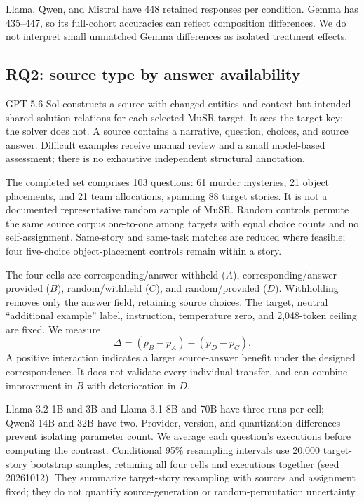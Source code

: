 Llama, Qwen, and Mistral have 448 retained responses per condition. Gemma has 435--447, so its full-cohort accuracies can reflect composition differences. We do not interpret small unmatched Gemma differences as isolated treatment effects.

\subsection{RQ2: source type by answer availability}
GPT-5.6-Sol constructs a source with changed entities and context but intended shared solution relations for each selected MuSR target. It sees the target key; the solver does not. A source contains a narrative, question, choices, and source answer. Difficult examples receive manual review and a small model-based assessment; there is no exhaustive independent structural annotation.

The completed set comprises 103 questions: 61 murder mysteries, 21 object placements, and 21 team allocations, spanning 88 target stories. It is not a documented representative random sample of MuSR. Random controls permute the same source corpus one-to-one among targets with equal choice counts and no self-assignment. Same-story and same-task matches are reduced where feasible; four five-choice object-placement controls remain within a story.

The four cells are corresponding/answer withheld ($A$), corresponding/answer provided ($B$), random/withheld ($C$), and random/provided ($D$). Withholding removes only the answer field, retaining source choices. The target, neutral ``additional example'' label, instruction, temperature zero, and 2,048-token ceiling are fixed. We measure
\begin{equation}
\Delta=(p_B-p_A)-(p_D-p_C).
\label{eq:interaction}
\end{equation}
A positive interaction indicates a larger source-answer benefit under the designed correspondence. It does not validate every individual transfer, and can combine improvement in $B$ with deterioration in $D$.

Llama-3.2-1B and 3B and Llama-3.1-8B and 70B have three runs per cell; Qwen3-14B and 32B have two. Provider, version, and quantization differences prevent isolating parameter count. We average each question's executions before computing the contrast. Conditional 95\% resampling intervals use 20,000 target-story bootstrap samples, retaining all four cells and executions together (seed 20261012). They summarize target-story resampling with sources and assignment fixed; they do not quantify source-generation or random-permutation uncertainty.

